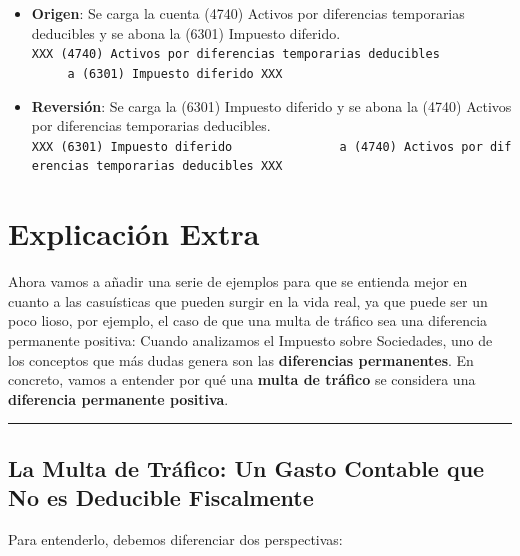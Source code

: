 \documentclass[
  paper=a4,
  ,captions=tableheading
]{scrbook}
\providecommand{\tightlist}{%
  \setlength{\itemsep}{0pt}\setlength{\parskip}{0pt}}
\begin{document}
\begin{itemize}
  \begin{itemize}
  \tightlist
  \item
    \textbf{Origen}: Se carga la cuenta (4740) Activos por diferencias
    temporarias deducibles y se abona la (6301) Impuesto diferido.
    \texttt{XXX\ (4740)\ Activos\ por\ diferencias\ temporarias\ deducibles\ \ \ \ \ \ \ \ \ \ \ \ \ \ \ a\ (6301)\ Impuesto\ diferido\ XXX}
  \item
    \textbf{Reversión}: Se carga la (6301) Impuesto diferido y se abona
    la (4740) Activos por diferencias temporarias deducibles.
    \texttt{XXX\ (6301)\ Impuesto\ diferido\ \ \ \ \ \ \ \ \ \ \ \ \ \ \ a\ (4740)\ Activos\ por\ diferencias\ temporarias\ deducibles\ XXX}
  \end{itemize}
\end{itemize}

\hypertarget{explicaciuxf3n-extra}{%
\section{Explicación Extra}\label{explicaciuxf3n-extra}}

Ahora vamos a añadir una serie de ejemplos para que se entienda mejor en
cuanto a las casuísticas que pueden surgir en la vida real, ya que puede
ser un poco lioso, por ejemplo, el caso de que una multa de tráfico sea
una diferencia permanente positiva: Cuando analizamos el Impuesto sobre
Sociedades, uno de los conceptos que más dudas genera son las
\textbf{diferencias permanentes}. En concreto, vamos a entender por qué
una \textbf{multa de tráfico} se considera una \textbf{diferencia
permanente positiva}.

\begin{center}\rule{0.5\linewidth}{0.5pt}\end{center}

\hypertarget{la-multa-de-truxe1fico-un-gasto-contable-que-no-es-deducible-fiscalmente}{%
\subsection{La Multa de Tráfico: Un Gasto Contable que No es Deducible
Fiscalmente}\label{la-multa-de-truxe1fico-un-gasto-contable-que-no-es-deducible-fiscalmente}}

Para entenderlo, debemos diferenciar dos perspectivas:
\end{document}
